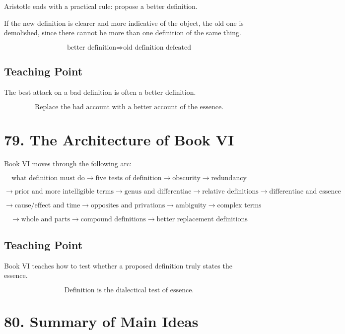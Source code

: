 \documentclass[12pt]{article}
\begin{document}
Aristotle ends with a practical rule: propose a better definition.

If the new definition is clearer and more indicative of the object, the old one
is demolished, since there cannot be more than one definition of the same thing.

\[
\text{better definition} \Rightarrow \text{old definition defeated}
\]

\subsection*{Teaching Point}

The best attack on a bad definition is often a better definition.

\[
\boxed{
\text{Replace the bad account with a better account of the essence.}
}
\]

\section*{79. The Architecture of Book VI}

Book VI moves through the following arc:

\[
\text{what definition must do}
\rightarrow
\text{five tests of definition}
\rightarrow
\text{obscurity}
\rightarrow
\text{redundancy}
\]

\[
\rightarrow
\text{prior and more intelligible terms}
\rightarrow
\text{genus and differentiae}
\rightarrow
\text{relative definitions}
\rightarrow
\text{differentiae and essence}
\]

\[
\rightarrow
\text{cause/effect and time}
\rightarrow
\text{opposites and privations}
\rightarrow
\text{ambiguity}
\rightarrow
\text{complex terms}
\]

\[
\rightarrow
\text{whole and parts}
\rightarrow
\text{compound definitions}
\rightarrow
\text{better replacement definitions}
\]

\subsection*{Teaching Point}

Book VI teaches how to test whether a proposed definition truly states the
essence.

\[
\boxed{
\text{Definition is the dialectical test of essence.}
}
\]

\section*{80. Summary of Main Ideas}
\end{document}
